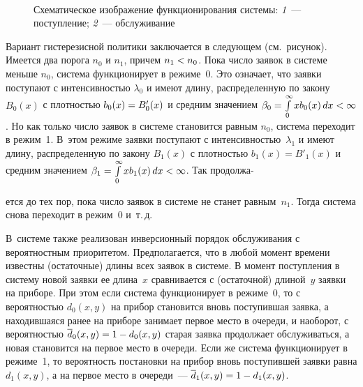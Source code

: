 \begin{multicols}{2}
\begin{figure*} %
\vspace*{1pt}
 \begin{center}
 \mbox{%
 \epsfxsize=114.642mm
 }
\end{center}
\begin{center}
{\small Схематическое изображение функционирования системы: \textit{1}~--- поступление; 
\textit{2}~---
обслуживание}
 \end{center}
\end{figure*}



Вариант гистерезисной политики заключается в следующем
(см.\ рисунок).
Имеется два порога $n_0$ и $n_1$, причем $n_1\hm<n_0$.
Пока число заявок в системе меньше $n_0$, система
функционирует в режиме~0.
Это означает, что заявки поступают с
интенсивностью $\lambda_0$ и имеют длину, распределенную
по закону $B_0(x)$ с плот\-ностью $b_0(x)\hm=B'_0(x)$
и средним значением
$\beta_0\hm=\int\limits_0^\infty x b_0(x)\, dx\hm<\infty$.
Но как только число заявок в системе становится равным
$n_0$, система переходит в режим~1.
В~этом режиме заявки поступают с интенсивностью~$\lambda_1$ и имеют длину, 
распределенную по закону $B_1(x)$
с плотностью $b_1(x)=B'_1(x)$ и средним значением
$\beta_1\hm=\int\limits_0^\infty x b_1(x)\, dx\hm<\infty$.
Так продолжа-\linebreak\vspace*{-12pt}

\pagebreak

\noindent
ется до тех пор, пока чис\-ло заявок в сис\-те\-ме не
станет равным~$n_1$.
Тогда система снова переходит в режим~0 и~т.\,д.


В~системе также реализован инверсионный порядок
обслуживания с вероятностным приоритетом.
Предполагается, что в любой момент времени известны
(остаточные) длины всех заявок в системе.
В момент поступления в систему новой заявки ее длина~$x$
сравнивается с (остаточной) длиной~$y$ заявки на приборе.
При этом если система функционирует в режиме~0, то с
вероятностью $d_0(x,y)$ на прибор становится вновь
поступившая заявка, а находившаяся ранее на приборе
занимает первое место в очереди, и наоборот, с
вероятностью $\d_0(x,y)\hm=1\hm-d_0(x,y)$ старая заявка
продолжает обслуживаться, а новая становится на первое
место в очереди.
Если же система функционирует в режиме~1, то
вероятность постановки на прибор вновь поступившей
заявки равна $d_1(x,y)$, а на первое мес\-то в очереди~---
$\d_1(x,y)\hm=1\hm-d_1(x,y)$.


\end{multicols}
